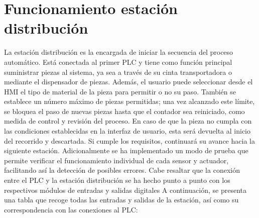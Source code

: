  
\section{Funcionamiento estación distribución}
\label{sec:funcionamiento_distribucion}

La estación distribución es la encargada de iniciar la secuencia del proceso automático. Está conectada al primer PLC y tiene como función principal suministrar piezas al sistema, ya sea a través de su cinta transportadora o mediante el dispensador de piezas. Además, el usuario puede seleccionar desde el HMI el tipo de material de la pieza para permitir o no su paso. También se establece un número máximo de piezas permitidas; una vez alcanzado este límite, se bloquea el paso de nuevas piezas hasta que el contador sea reiniciado, como medida de control y revisión del proceso. En caso de que la pieza no cumpla con las condiciones establecidas en la interfaz de usuario, esta será devuelta al inicio del recorrido y descartada. Si cumple los requisitos, continuará su avance hacia la siguiente estación. Adicionalmente se ha implementado un modo de prueba que permite verificar el funcionamiento individual de cada sensor y actuador, facilitando así la detección de posibles errores. Cabe resaltar que la conexión entre el PLC y la estación distribución se ha hecho punto a punto con los respectivos módulos de entradas y salidas digitales A continuación, se presenta una tabla que recoge todas las entradas y salidas de la estación, así como su correspondencia con las conexiones al PLC:

